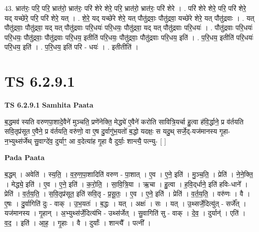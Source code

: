 \documentclass[17pt]{extarticle}
\begin{document}
43. भ्रात॑रः॒ परि॒ परि॒ भ्रात॑रो॒ भ्रात॑रः॒ परि॑ शेरे शेरे॒ परि॒ भ्रात॑रो॒ भ्रात॑रः॒ परि॑ शेरे । . परि॑ शेरे शेरे॒ परि॒ परि॑ शेरे॒ यद् यच्छे॑रे॒ परि॒ परि॑ शेरे॒ यत् । . शे॒रे॒ यद् यच्छे॑रे शेरे॒ यत् पौतु॑द्रवाः॒ पौतु॑द्रवा॒ यच्छे॑रे शेरे॒ यत् पौतु॑द्रवाः । . यत् पौतु॑द्रवाः॒ पौतु॑द्रवा॒ यद् यत् पौतु॑द्रवाः परि॒धयः॑ परि॒धयः॒ पौतु॑द्रवा॒ यद् यत् पौतु॑द्रवाः परि॒धयः॑ । . पौतु॑द्रवाः परि॒धयः॑ परि॒धयः॒ पौतु॑द्रवाः॒ पौतु॑द्रवाः परि॒धय॒ इतीति॑ परि॒धयः॒ पौतु॑द्रवाः॒ पौतु॑द्रवाः परि॒धय॒ इति॑ । . प॒रि॒धय॒ इतीति॑ परि॒धयः॑ परि॒धय॒ इति॑ । . प॒रि॒धय॒ इति॑ परि - धयः॑ । . इतीतीति॑ । \newline
\pagebreak
{}

\section{ TS 6.2.9.1 }

\textbf{TS 6.2.9.1 } \newline
\textbf{Samhita Paata} \newline

ब॒द्धमव॑ स्यति वरुणपा॒शादे॒वैने॑ मुञ्चति॒ प्रणे॑नेक्ति॒ मेद्ध्ये॑ ए॒वैने॑ करोति सावित्रि॒यर्चा हु॒त्वा ह॑वि॒र्द्धाने॒ प्र व॑र्तयति सवि॒तृप्र॑सूत ए॒वैने॒ प्र व॑र्तयति॒ वरु॑णो॒ वा ए॒ष दु॒र्वागु॑भ॒यतो॑ ब॒द्धो यदक्षः॒ स यदु॒थ् सर्जे॒द्-यज॑मानस्य गृ॒हा-न॒भ्युथ्स॑र्जेथ् सु॒वाग्दे॑व॒ दुर्याꣳ॒॒ आ व॒देत्या॑ह गृ॒हा वै दुर्याः॒ शान्त्यै॒ पत्न्यु- [  ] \newline

\textbf{Pada Paata} \newline

ब॒द्धम् । अवेति॑ । स्य॒ति॒ । व॒रु॒ण॒पा॒शादिति॑ वरुण - पा॒शात् । ए॒व । ए॒ने॒ इति॑ । मु॒ञ्च॒ति॒ । प्रेति॑ । ने॒ने॒क्ति॒ । मेद्ध्ये॒ इति॑ । ए॒व । ए॒ने॒ इति॑ । क॒रो॒ति॒ । सा॒वि॒त्रि॒या । ऋ॒चा । हु॒त्वा । ह॒वि॒द्‌र्धाने॒ इति॑ हविः-धाने᳚ । प्रेति॑ । व॒र्त॒य॒ति॒ । स॒वि॒तृप्र॑सूत॒ इति॑ सवि॒तृ - प्र॒सू॒तः॒ । ए॒व । ए॒ने॒ इति॑ । प्रेति॑ । व॒र्त॒य॒ति॒ । वरु॑णः । वै । ए॒षः । दु॒र्वागिति॑ दुः - वाक् । उ॒भ॒यतः॑ । ब॒द्धः । यत् । अक्षः॑ । सः । यत् । उ॒थ्सर्जे॒दित्यु॑त् - सर्जे᳚त् । यज॑मानस्य । गृ॒हान् । अ॒भ्युथ्स॑र्जे॒दित्य॑भि - उथ्स॑र्जेत् । सु॒वागिति॑ सु - वाक् । दे॒व॒ । दुर्यान्॑ । एति॑ । व॒द॒ । इति॑ । आ॒ह॒ । गृ॒हाः । वै । दुर्याः᳚ । शान्त्यै᳚ । पत्नी᳚ ।  \newline
\end{document}
